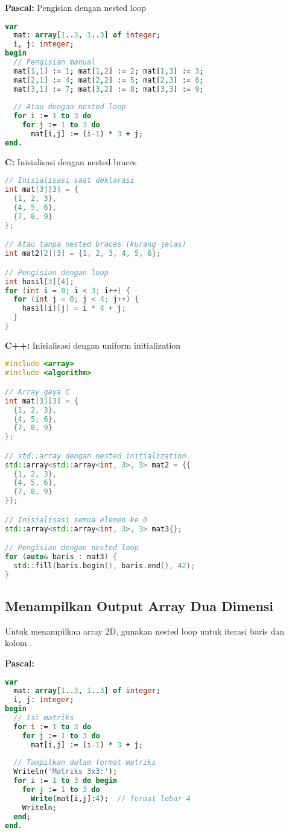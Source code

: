 \documentclass[../main.tex]{subfiles}
\begin{document}
\textbf{Pascal:} Pengisian dengan nested loop
\begin{lstlisting}[language=Pascal, caption={Inisialisasi array 2D di Pascal}]
var
  mat: array[1..3, 1..3] of integer;
  i, j: integer;
begin
  // Pengisian manual
  mat[1,1] := 1; mat[1,2] := 2; mat[1,3] := 3;
  mat[2,1] := 4; mat[2,2] := 5; mat[2,3] := 6;
  mat[3,1] := 7; mat[3,2] := 8; mat[3,3] := 9;
  
  // Atau dengan nested loop
  for i := 1 to 3 do
    for j := 1 to 3 do
      mat[i,j] := (i-1) * 3 + j;
end.
\end{lstlisting}

\textbf{C:} Inisialisasi dengan nested braces
\begin{lstlisting}[language=C, caption={Inisialisasi array 2D di C}]
// Inisialisasi saat deklarasi
int mat[3][3] = {
  {1, 2, 3},
  {4, 5, 6},
  {7, 8, 9}
};

// Atau tanpa nested braces (kurang jelas)
int mat2[2][3] = {1, 2, 3, 4, 5, 6};

// Pengisian dengan loop
int hasil[3][4];
for (int i = 0; i < 3; i++) {
  for (int j = 0; j < 4; j++) {
    hasil[i][j] = i * 4 + j;
  }
}
\end{lstlisting}

\textbf{C++:} Inisialisasi dengan uniform initialization
\begin{lstlisting}[language=C++, caption={Inisialisasi array 2D di C++}]
#include <array>
#include <algorithm>

// Array gaya C
int mat[3][3] = {
  {1, 2, 3},
  {4, 5, 6},
  {7, 8, 9}
};

// std::array dengan nested initialization
std::array<std::array<int, 3>, 3> mat2 = {{
  {1, 2, 3},
  {4, 5, 6},
  {7, 8, 9}
}};

// Inisialisasi semua elemen ke 0
std::array<std::array<int, 3>, 3> mat3{};

// Pengisian dengan nested loop
for (auto& baris : mat3) {
  std::fill(baris.begin(), baris.end(), 42);
}
\end{lstlisting}

\subsection{Menampilkan Output Array Dua Dimensi}

Untuk menampilkan array 2D, gunakan nested loop untuk iterasi baris dan kolom \parencite{cplusplus-multidimensional,tutorialspoint-2d-arrays}.

\textbf{Pascal:}
\begin{lstlisting}[language=Pascal, caption={Menampilkan array 2D di Pascal}]
var
  mat: array[1..3, 1..3] of integer;
  i, j: integer;
begin
  // Isi matriks
  for i := 1 to 3 do
    for j := 1 to 3 do
      mat[i,j] := (i-1) * 3 + j;
  
  // Tampilkan dalam format matriks
  Writeln('Matriks 3x3:');
  for i := 1 to 3 do begin
    for j := 1 to 3 do
      Write(mat[i,j]:4);  // format lebar 4
    Writeln;
  end;
end.
\end{lstlisting}
\end{document}
